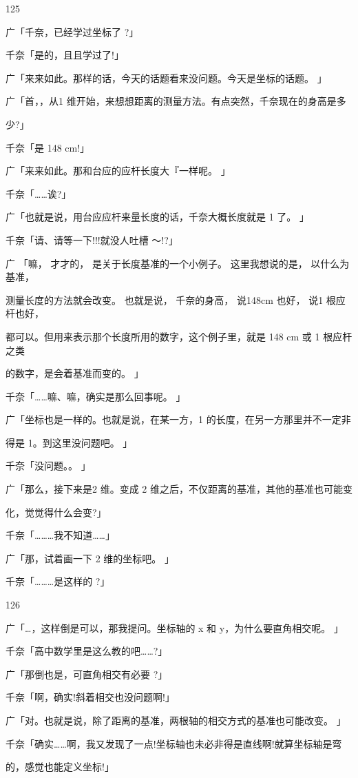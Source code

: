 125\par
广「千奈，已经学过坐标了 ?」\par
千奈「是的，且且学过了!」\par
广「来来如此。那样的话，今天的话题看来没问题。今天是坐标的话题。 」\par
广「首，，从1 维开始，来想想距离的测量方法。有点突然，千奈现在的身高是多\par
少?」\par
千奈「是 148 cm!」\par
广「来来如此。那和台应的应杆长度大『一样呢。 」\par
千奈「……诶?」\par
广「也就是说，用台应应杆来量长度的话，千奈大概长度就是 1 了。 」\par
千奈「请、请等一下!!!就没人吐槽 ～!?」\par
广 「嘛， 才才的， 是关于长度基准的一个小例子。 这里我想说的是， 以什么为基准，\par
测量长度的方法就会改变。 也就是说， 千奈的身高， 说148cm 也好， 说1 根应杆也好，\par
都可以。但用来表示那个长度所用的数字，这个例子里，就是 148 cm 或 1 根应杆之类\par
的数字，是会着基准而变的。 」\par
千奈「……嘛、嘛，确实是那么回事呢。 」\par
广「坐标也是一样的。也就是说，在某一方，1 的长度，在另一方那里并不一定非\par
得是 1。到这里没问题吧。 」\par
千奈「没问题。。 」\par
广「那么，接下来是2 维。变成 2 维之后，不仅距离的基准，其他的基准也可能变\par
化，觉觉得什么会变?」\par
千奈「………我不知道……」\par
广「那，试着画一下 2 维的坐标吧。 」\par
千奈「………是这样的 ?」\par

126\par
广「…，这样倒是可以，那我提问。坐标轴的 x 和 y，为什么要直角相交呢。 」\par
千奈「高中数学里是这么教的吧……?」\par
广「那倒也是，可直角相交有必要 ?」\par
千奈「啊，确实!斜着相交也没问题啊!」\par
广「对。也就是说，除了距离的基准，两根轴的相交方式的基准也可能改变。 」\par
千奈「确实……啊，我又发现了一点!坐标轴也未必非得是直线啊!就算坐标轴是弯\par
的，感觉也能定义坐标!」\par

